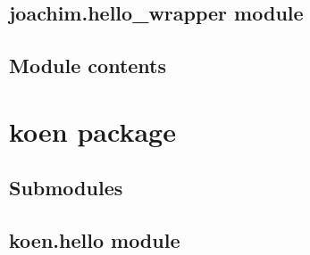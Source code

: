 \documentclass[letterpaper,10pt,english]{sphinxmanual}
\begin{document}
\begin{fulllineitems}
\label{\detokenize{joachim:joachim.hello.say_hello}}
\end{fulllineitems}



\subsection{joachim.hello\_wrapper module}
\label{\detokenize{joachim:joachim-hello-wrapper-module}}

\subsection{Module contents}
\label{\detokenize{joachim:module-joachim}}\label{\detokenize{joachim:module-contents}}

\section{koen package}
\label{\detokenize{koen:koen-package}}\label{\detokenize{koen::doc}}

\subsection{Submodules}
\label{\detokenize{koen:submodules}}

\subsection{koen.hello module}
\label{\detokenize{koen:module-koen.hello}}\label{\detokenize{koen:koen-hello-module}}

\begin{fulllineitems}
\label{\detokenize{koen:koen.hello.say_hello}}
\end{fulllineitems}
\end{document}
